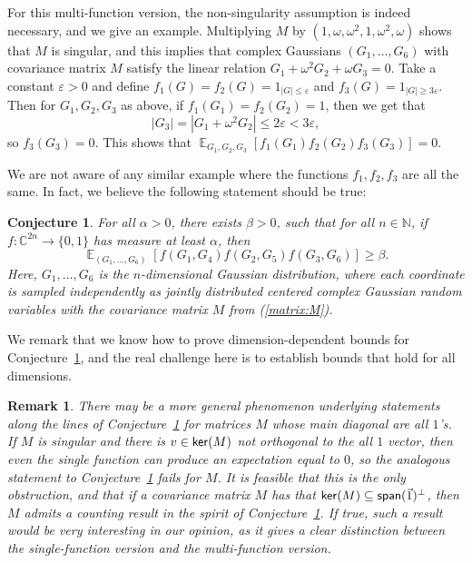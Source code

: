 \documentclass[11pt]{article}
\newtheorem{conj}[thm]{Conjecture}
\newtheorem{remark}[thm]{Remark}
\newcommand\card[1]{\left| {#1} \right|}
\newcommand\Expect[2]{{\mathop{\mathbb{E}}_{#1}\left[ {#2} \right]}}
\newcommand\eps{\varepsilon}
\renewcommand\geq{\geqslant}
\renewcommand\leq{\leqslant}
\begin{document}
For this multi-function version, the non-singularity assumption is indeed necessary, and we give an example. Multiplying $M$ by $(1,\omega,\omega^2,1,\omega^2,\omega)$ shows that $M$ is singular, and this implies that complex Gaussians $(G_1,\ldots,G_6)$ with covariance matrix $M$ satisfy the linear relation $G_1+\omega^2 G_2 + \omega G_3 = 0$. Take a constant $\eps>0$ and define $f_1(G)=f_2(G) = 1_{\card{G}\leq \eps}$ and 
$f_3(G) = 1_{\card{G}\geq 3\eps}$. Then for $G_1,G_2,G_3$ as above, if $f_1(G_1)=f_2(G_2)=1$, then we get that
\[
\card{G_3}=\card{G_1+\omega^2 G_2}\leq 2\eps< 3\eps,
\]
so $f_3(G_3) = 0$. This shows that $\Expect{G_1,G_2,G_3}{f_1(G_1)f_2(G_2)f_3(G_3)} = 0$.

We are not aware of any similar example where the functions $f_1,f_2,f_3$ are all the same. In fact, we believe the following statement should be true:
\begin{conj}\label{conj:equil_triangle}
    For all $\alpha>0$, there exists $\beta>0$, such that for all $n\in\mathbb{N}$, if $f\colon \mathbb{C}^{2n}\to\{0,1\}$ has measure at least $\alpha$, then
    \[
    \Expect{(G_1,\ldots,G_6)}{f(G_1,G_4)f(G_2,G_5)f(G_3,G_6)}\geq \beta.
    \]
    Here, $G_1,\ldots,G_6$ is the $n$-dimensional Gaussian distribution, where each coordinate is sampled independently as jointly distributed centered complex Gaussian random variables with the covariance matrix $M$ from (\ref{matrix:M}).
\end{conj}
We remark that we know how to prove dimension-dependent bounds for Conjecture~\ref{conj:equil_triangle}, and the real challenge here is to establish bounds that hold for all dimensions. 

\begin{remark}
    There may be a more general phenomenon underlying statements along the lines of Conjecture~\ref{conj:equil_triangle} for matrices $M$ whose main diagonal are all $1$'s. If $M$ is singular and there is $v\in {\sf ker}(M)$ not orthogonal to the all $1$ vector, then even the single function can produce an expectation equal to $0$, so the analogous statement to Conjecture~\ref{conj:equil_triangle} fails for $M$. It is feasible that this is the only obstruction, and that if a covariance matrix $M$ has that ${\sf ker}(M)\subseteq{\sf span}(\vec{1})^{\bot}$, then $M$ admits a counting result in the spirit of Conjecture~\ref{conj:equil_triangle}. If true, such a result would be very interesting in our opinion, as it gives a clear distinction between the single-function version and the multi-function version.
\end{remark}
\end{document}
